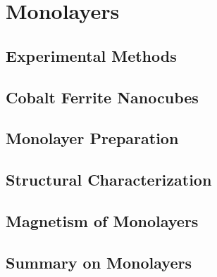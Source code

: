\documentclass[\main/dresen_thesis.tex]{subfiles}
\renewcommand{\thisPath}{\main/chapters/monolayers}
\begin{document}
  \chapter{Monolayers}\label{ch:monolayers}
    

    \section{Experimental Methods}
      
        \FloatBarrier
        \clearpage

    \section{Cobalt Ferrite Nanocubes}
      
        \FloatBarrier
        \clearpage

    \section{Monolayer Preparation}
      
      \FloatBarrier
      \clearpage

    \section{Structural Characterization}
      
      \FloatBarrier

    \section{Magnetism of Monolayers}
      
      \FloatBarrier

    \clearpage
    \section{Summary on Monolayers}
      
      \FloatBarrier
\end{document}
